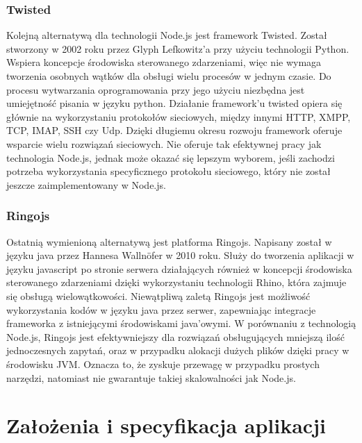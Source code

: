 \documentclass[12pt]{report}
\begin{document}
\subsection{Twisted}
Kolejną alternatywą dla technologii Node.js jest framework Twisted.
Został stworzony w 2002 roku przez Glyph Lefkowitz'a przy użyciu technologii Python.
Wspiera koncepcje środowiska sterowanego zdarzeniami, więc nie wymaga tworzenia osobnych wątków dla obsługi wielu procesów w jednym czasie. 
Do procesu wytwarzania oprogramowania przy jego użyciu niezbędna jest umiejętność pisania w języku python.
Działanie framework'u twisted opiera się głównie na wykorzystaniu protokołów sieciowych, między innymi HTTP, XMPP, TCP, IMAP, SSH czy Udp.
Dzięki długiemu okresu rozwoju framework oferuje wsparcie wielu rozwiązań sieciowych.
Nie oferuje tak efektywnej pracy jak technologia Node.js, jednak może okazać się lepszym wyborem, jeśli zachodzi potrzeba wykorzystania specyficznego protokołu sieciowego, który nie został jeszcze zaimplementowany w Node.js.

\subsection{Ringojs}
Ostatnią wymienioną alternatywą jest platforma Ringojs.
Napisany został w języku java przez Hannesa Wallnöfer w 2010 roku.
Służy do tworzenia aplikacji w języku javascript po stronie serwera działających również w koncepcji środowiska sterowanego zdarzeniami dzięki wykorzystaniu technologii Rhino, która zajmuje się obsługą wielowątkowości. 
Niewątpliwą zaletą Ringojs jest możliwość wykorzystania kodów w języku java przez serwer, zapewniając integracje frameworka z istniejącymi środowiskami java'owymi.
W porównaniu z technologią Node.js, Ringojs jest efektywniejszy dla rozwiązań obsługujących mniejszą ilość jednoczesnych zapytań, oraz w przypadku alokacji dużych plików
dzięki pracy w środowisku JVM. 
Oznacza to, że zyskuje przewagę w przypadku prostych narzędzi, natomiast nie gwarantuje takiej skalowalności jak Node.js.

\chapter{Założenia i specyfikacja aplikacji}
\end{document}
